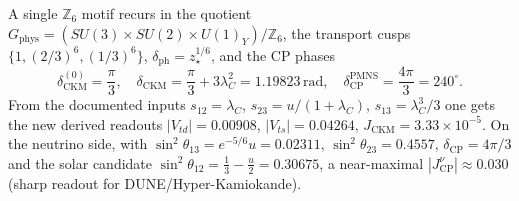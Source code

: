 \documentclass[11pt,a4paper]{article}
\newcommand{\useed}{u}
\newcommand{\dph}{\delta_{\mathrm{ph}}}
\newcommand{\lC}{\lambda_C}
\theoremstyle{definition}
\begin{document}
A single $\mathbb Z_6$ motif recurs in the quotient $G_{\mathrm{phys}}=(SU(3){\times}SU(2){\times}U(1)_Y)/\mathbb Z_6$,
the transport cusps $\{1,(2/3)^6,(1/3)^6\}$, $\dph=z_\star^{1/6}$, and the CP phases
\begin{equation}
  \delta^{(0)}_{\mathrm{CKM}}=\frac{\pi}{3},\quad
  \delta_{\mathrm{CKM}}=\frac{\pi}{3}+3\lC^2=1.19823\,\mathrm{rad},\quad
  \delta^{\mathrm{PMNS}}_{\mathrm{CP}}=\frac{4\pi}{3}=240^\circ .
\end{equation}
From the documented inputs $s_{12}=\lC$, $s_{23}=\useed/(1+\lC)$, $s_{13}=\lC^3/3$ one gets the new
derived readouts $|V_{td}|=0.00908$, $|V_{ts}|=0.04264$, $J_{\mathrm{CKM}}=3.33\times10^{-5}$. On
the neutrino side, with $\sin^2\theta_{13}=e^{-5/6}\useed=0.02311$, $\sin^2\theta_{23}=0.4557$,
$\delta_{\mathrm{CP}}=4\pi/3$ and the solar candidate $\sin^2\theta_{12}=\tfrac13-\tfrac{\useed}{2}=0.30675$,
a near-maximal $|J^\nu_{\mathrm{CP}}|\approx0.030$ (sharp readout for DUNE/Hyper-Kamiokande). \mC
\end{document}
